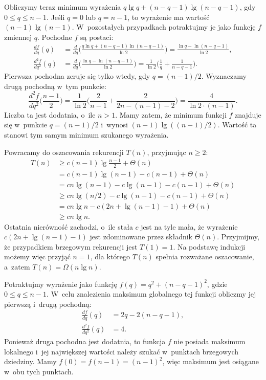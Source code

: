 Obliczymy teraz minimum wyrażenia $q\lg q+(n-q-1)\lg(n-q-1)$, gdy $0\le q\le n-1$. Jeśli $q=0$ lub $q=n-1$, to wyrażenie ma wartość $(n-1)\lg(n-1)$. W~pozostałych przypadkach potraktujmy je jako funkcję $f$ zmiennej $q$. Pochodne $f$ są postaci:
\begin{align*}
    \frac{df}{dq}(q) &= \frac{d}{dq}\biggl(\frac{q\ln q+(n-q-1)\ln(n-q-1)}{\ln2}\biggr) = \frac{\ln q-\ln(n-q-1)}{\ln2}, \\[1mm]
	\frac{d^2\!f}{dq^2}(q) &= \frac{d}{dq}\biggl(\frac{\ln q-\ln(n-q-1)}{\ln2}\biggr) = \frac{1}{\ln2}\biggl(\frac{1}{q}+\frac{1}{n-q-1}\biggr).
\end{align*}
Pierwsza pochodna zeruje się tylko wtedy, gdy $q=(n-1)/2$. Wyznaczamy drugą pochodną w~tym punkcie:
\[
    \frac{d^2\!f}{dq^2}\biggl(\frac{n-1}{2}\biggr) = \frac{1}{\ln2}\biggl(\frac{2}{n-1}+\frac{2}{2n-(n-1)-2}\biggr) = \frac{4}{\ln2\cdot(n-1)}.
\]
Liczba ta jest dodatnia, o~ile $n>1$. Mamy zatem, że minimum funkcji $f$ znajduje się w~punkcie $q=(n-1)/2$ i~wynosi $(n-1)\lg((n-1)/2)$. Wartość ta stanowi tym samym minimum szukanego wyrażenia.

Powracamy do oszacowania rekurencji $T(n)$, przyjmując $n\ge2$:
\begin{align*}
    T(n) &\ge c(n-1)\lg\frac{n-1}{2}+\Theta(n) \\
	&= c(n-1)\lg(n-1)-c(n-1)+\Theta(n) \\
	&= cn\lg(n-1)-c\lg(n-1)-c(n-1)+\Theta(n) \\
	&\ge cn\lg(n/2)-c\lg(n-1)-c(n-1)+\Theta(n) \\
	&= cn\lg n-c(2n+\lg(n-1)-1)+\Theta(n) \\
	&\ge cn\lg n.
\end{align*}
Ostatnia nierówność zachodzi, o~ile stała $c$ jest na tyle mała, że wyrażenie $c(2n+\lg(n-1)-1)$ jest zdominowane przez składnik $\Theta(n)$. Przyjmijmy, że przypadkiem brzegowym rekurencji jest $T(1)=1$. Na podstawę indukcji możemy więc przyjąć $n=1$, dla którego $T(n)$ spełnia rozważane oszacowanie, a~zatem $T(n)=\Omega(n\lg n)$.

\exercise %
Potraktujmy wyrażenie jako funkcję $f(q)=q^2+(n-q-1)^2$, gdzie $0\le q\le n-1$. W~celu znalezienia maksimum globalnego tej funkcji obliczmy jej pierwszą i~drugą pochodną:
\begin{align*}
    \frac{df}{dq}(q) &= 2q-2(n-q-1), \\
	\frac{d^2\!f}{dq^2}(q) &= 4.
\end{align*}
Ponieważ druga pochodna jest dodatnia, to funkcja $f$ nie posiada maksimum lokalnego i~jej największej wartości należy szukać w~punktach brzegowych dziedziny. Mamy $f(0)=f(n-1)=(n-1)^2$, więc maksimum jest osiągane w~obu tych punktach.


